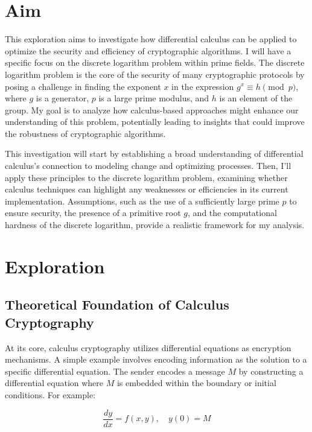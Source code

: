 \documentclass[12pt]{article}
\begin{document}
\section{Aim}
This exploration aims to investigate how differential calculus can be applied to optimize the security and efficiency of cryptographic algorithms. I will have a specific focus on the discrete logarithm problem within prime fields. The discrete logarithm problem is the core of the security of many cryptographic protocols by posing a challenge in finding the exponent \( x \) in the expression \( g^x \equiv h \pmod{p} \), where \( g \) is a generator, \( p \) is a large prime modulus, and \( h \) is an element of the group. My goal is to analyze how calculus-based approaches might enhance our understanding of this problem, potentially leading to insights that could improve the robustness of cryptographic algorithms.

This investigation will start by establishing a broad understanding of differential calculus’s connection to modeling change and optimizing processes. Then, I’ll apply these principles to the discrete logarithm problem, examining whether calculus techniques can highlight any weaknesses or efficiencies in its current implementation. Assumptions, such as the use of a sufficiently large prime \( p \) to ensure security, the presence of a primitive root \( g \), and the computational hardness of the discrete logarithm, provide a realistic framework for my analysis.






\section{Exploration}

\subsection*{Theoretical Foundation of Calculus Cryptography}

At its core, calculus cryptography utilizes differential equations as encryption mechanisms. A simple example involves encoding information as the solution to a specific differential equation. The sender encodes a message \( M \) by constructing a differential equation where \( M \) is embedded within the boundary or initial conditions. For example:

\[
\frac{dy}{dx} = f(x, y), \quad y(0) = M
\]
\end{document}
